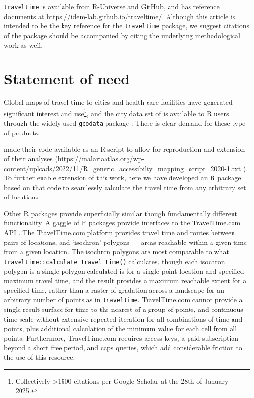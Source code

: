 \documentclass[
  10pt,
  letterpaper,
]{article}
\begin{document}
\texttt{traveltime} is available from
\href{https://idem-lab.r-universe.dev/traveltime}{R-Universe} and
\href{https://github.com/idem-lab/traveltime}{GitHub}, and has reference
documents at \url{https://idem-lab.github.io/traveltime/}. Although this
article is intended to be the key reference for the \texttt{traveltime}
package, we suggest citations of the package should be accompanied by
citing the underlying methodological work
\citep{weiss2018global, weiss2020global} as well.

\section{Statement of need}\label{statement-of-need}

Global maps of travel time to cities
\citep{weiss2018global, nelson2019suite} and health care facilities
\citep{hulland2019travel, weiss2020global} have generated significant
interest and use\footnote{Collectively \textgreater1600 citations per
  Google Scholar at the 28th of January 2025.}, and the city data set of
\citet{nelson2019suite} is available to R users through the widely-used
\texttt{geodata} package \citep{geodata}. There is clear demand for
these type of products.

\citet{weiss2020global} made their code available as an R script to
allow for reproduction and extension of their analyses
(\url{https://malariaatlas.org/wp-content/uploads/2022/11/R_generic_accessibilty_mapping_script_2020-1.txt}
). To further enable extension of this work, here we have developed an R
package based on that code to seamlessly calculate the travel time from
any arbitrary set of locations.

Other R packages provide superficially similar though fundamentally
different functionality. A gaggle of R packages provide interfaces to
the \href{https://www.TravelTime.com}{TravelTime.com} API
\citep{traveltimeapi, traveltimeR, rtraveltime, traveltime_gh}. The
TravelTime.com platform provides travel time and routes between pairs of
locations, and `isochron' polygons --- areas reachable within a given
time from a given location. The isochron polygons are most comparable to
what \texttt{traveltime::calculate\_travel\_time()} calculates, though
each isochron polygon is a single polygon calculated is for a single
point location and specified maximum travel time, and the result
provides a maximum reachable extent for a specified time, rather than a
raster of gradation across a landscape for an arbitrary number of points
as in \texttt{traveltime}. TravelTime.com cannot provide a single result
surface for time to the nearest of a group of points, and continuous
time scale without extensive repeated iteration for all combinations of
time and points, plus additional calculation of the minimum value for
each cell from all points. Furthermore, TravelTime.com requires access
keys, a paid subscription beyond a short free period, and caps queries,
which add considerable friction to the use of this resource.
\end{document}
